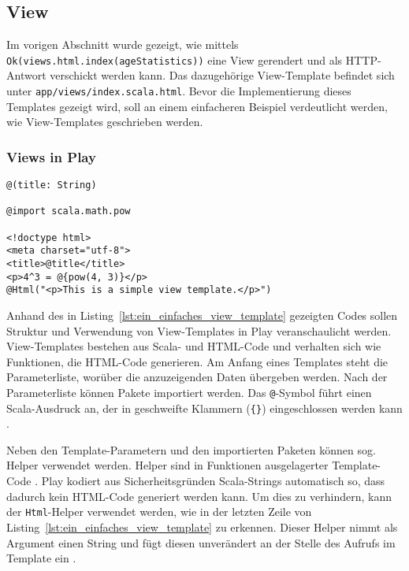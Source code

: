 

\subsection{View} %
\label{sub:view}

Im vorigen Abschnitt wurde gezeigt, wie mittels \lstinline|Ok(views.html.index(ageStatistics))| eine View gerendert und als HTTP-Antwort verschickt werden kann.
Das dazugehörige View-Template befindet sich unter \lstinline|app/views/index.scala.html|.
Bevor die Implementierung dieses Templates gezeigt wird, soll an einem einfacheren Beispiel verdeutlicht werden, wie View-Templates geschrieben werden.

\subsubsection{Views in Play} %
\label{ssub:views_in_play}

\begin{lstlisting}[caption=Ein einfaches View-Template, label=lst:ein_einfaches_view_template]
@(title: String)

@import scala.math.pow

<!doctype html>
<meta charset="utf-8">
<title>@title</title>
<p>4^3 = @{pow(4, 3)}</p>
@Html("<p>This is a simple view template.</p>")
\end{lstlisting}

Anhand des in Listing~\ref{lst:ein_einfaches_view_template} gezeigten Codes sollen Struktur und Verwendung von View-Templates in Play veranschaulicht werden.
View-Templates bestehen aus Scala- und HTML-Code und verhalten sich wie Funktionen, die HTML-Code generieren.
Am Anfang eines Templates steht die Parameterliste, worüber die anzuzeigenden Daten übergeben werden.
Nach der Parameterliste können Pakete importiert werden.
Das \lstinline|@|-Symbol führt einen Scala-Ausdruck an, der in geschweifte Klammern (\lstinline|{}|) eingeschlossen werden kann \cite[vgl.][]{play_templates}.

Neben den Template-Parametern und den importierten Paketen können sog. Helper verwendet werden.
Helper sind in Funktionen ausgelagerter Template-Code \cite[vgl.][S.~179]{play_for_scala}.
Play kodiert aus Sicherheitsgründen Scala-Strings automatisch so, dass dadurch kein HTML-Code generiert werden kann.
Um dies zu verhindern, kann der \lstinline|Html|-Helper verwendet werden, wie in der letzten Zeile von Listing~\ref{lst:ein_einfaches_view_template} zu erkennen.
Dieser Helper nimmt als Argument einen String und fügt diesen unverändert an der Stelle des Aufrufs im Template ein \cite[vgl.][]{play_templates}.

